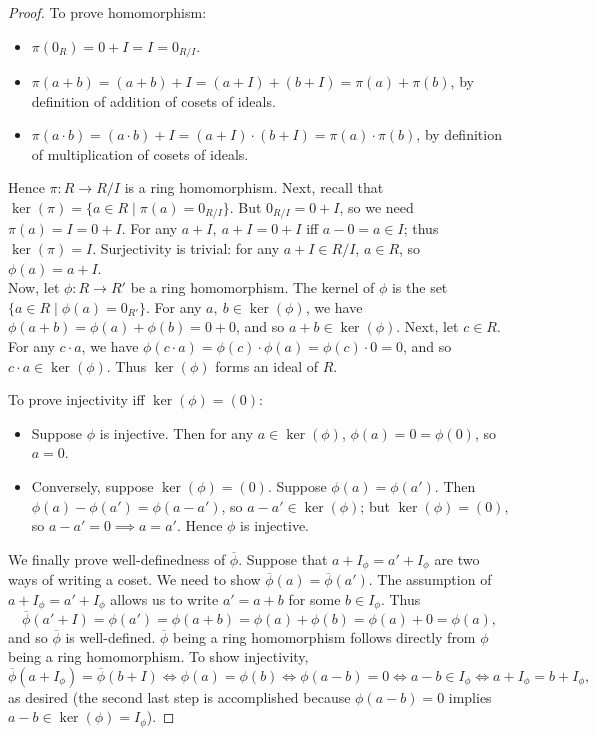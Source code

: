 \documentclass[math1530-lecture-notes]{subfiles}
\begin{document}
\begin{proof}[Proof]
  To prove homomorphism:
  \begin{itemize}
    \item $\pi(0_R)=0+I=I=0_{R / I}$.
    \item $\pi(a+b)=(a+b)+I=(a+I)+(b+I)=\pi(a)+\pi(b)$, by definition of addition of cosets of
      ideals.
    \item $\pi(a\cdot b)=(a\cdot b)+I=(a+I)\cdot (b+I)=\pi(a)\cdot \pi(b)$, by definition of
      multiplication of cosets of ideals.
  \end{itemize}
  Hence $\pi:R\to R / I$ is a ring homomorphism. Next, recall that $\ker(\pi)=\{a \in R\mid
  \pi(a)=0_{R/I}\}.$ But $0_{R / I}=0+I$, so we need $\pi(a)=I=0+I$. For any $a+I,\ a+I=0+I$ iff
  $a-0=a\in I$; thus $\ker(\pi)=I$. Surjectivity is trivial: for any $a+I\in R / I$, $a\in R$, so
  $\phi(a)=a+I$. \\

  Now, let $\phi:R\to R'$ be a ring homomorphism. The kernel of $\phi$ is the set $\{a\in R\mid
  \phi(a)=0_{R'}\} $. For any $a,\ b\in \ker(\phi)$, we have $\phi(a+b)=\phi(a)+\phi(b)=0+0$, and so
  $a+b\in \ker(\phi)$. Next, let $c\in R$. For any $c\cdot a$, we have $\phi(c\cdot a)=\phi(c)\cdot
  \phi(a)=\phi(c)\cdot 0=0$, and so $c\cdot a\in \ker(\phi)$. Thus $\ker(\phi)$ forms an ideal of
  $R$.

  To prove injectivity iff $\ker(\phi)=(0)$:
  \begin{itemize}
    \item Suppose $\phi$ is injective. Then for any $a\in \ker(\phi)$, $\phi(a)=0=\phi(0)$, so
      $a=0$.
    \item Conversely, suppose $\ker(\phi)=(0)$. Suppose $\phi(a)=\phi(a')$. Then
      $\phi(a)-\phi(a')=\phi(a-a')$, so $a-a'\in \ker(\phi)$; but $\ker(\phi)=(0)$, so $a-a'=0
      \implies a=a'$. Hence $\phi$ is injective.
  \end{itemize}

  We finally prove well-definedness of $\overline{\phi}$. Suppose that $a+I_\phi=a'+I_\phi$ are two
  ways of writing a coset. We need to show $ \overline{\phi}(a)=\overline{\phi}(a')$. The assumption
  of $a+I_\phi=a'+I_\phi$ allows us to write  $a'=a+b$ for some $b\in I_\phi$. Thus \[
  \overline{\phi}(a'+I)=\phi(a')=\phi(a+b)=\phi(a)+\phi(b)=\phi(a)+0=\phi(a),\] and so
  $\overline{\phi}$ is well-defined. $\overline{\phi}$ being a ring homomorphism follows directly
  from $\phi$ being a ring homomorphism. To show injectivity, \[
    \overline{\phi}(a+I_\phi)=\overline{\phi}(b+I) \iff \phi(a)=\phi(b) \iff \phi(a-b)=0 \iff a-b\in
    I_\phi \iff a+I_\phi = b+I_\phi
  ,\] as desired (the second last step is accomplished because $ \phi(a-b)=0$ implies $a-b\in
  \ker(\phi)=I_\phi$).


\end{proof}
\end{document}
